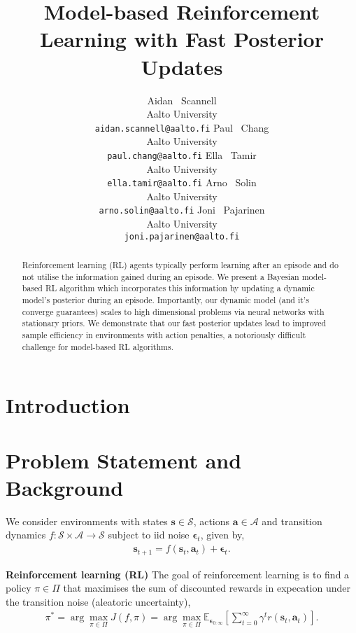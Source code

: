\documentclass{article}
\title{Model-based Reinforcement Learning with Fast Posterior Updates}
\author{%
  Aidan ~Scannell \\
  Aalto University\\
  \texttt{aidan.scannell@aalto.fi}
  \And
  Paul ~Chang \\
  Aalto University\\
  \texttt{paul.chang@aalto.fi}
  \And
  Ella ~Tamir \\
  Aalto University\\
  \texttt{ella.tamir@aalto.fi}
  \And
  Arno ~Solin \\
  Aalto University\\
  \texttt{arno.solin@aalto.fi}
  \And
  Joni ~Pajarinen \\
  Aalto University\\
  \texttt{joni.pajarinen@aalto.fi}
}
\newcommand{\state}{\ensuremath{\mathbf{s}}}
\newcommand{\action}{\ensuremath{\mathbf{a}}}
\newcommand{\noise}{\ensuremath{\bm\epsilon}}
\newcommand{\discount}{\ensuremath{\gamma}}
\newcommand{\stateDomain}{\ensuremath{\mathcal{S}}}
\newcommand{\actionDomain}{\ensuremath{\mathcal{A}}}
\newcommand{\policyDomain}{\ensuremath{\Pi}}
\newcommand{\rewardFn}{\ensuremath{r}}
\newcommand{\transitionFn}{\ensuremath{f}}
\newcommand{\policy}{\ensuremath{\pi}}
\begin{document}
\maketitle

\begin{abstract}
  Reinforcement learning (RL) agents typically perform learning after an episode and do not utilise the information gained during an episode.
  We present a Bayesian model-based RL algorithm which incorporates this information by updating a dynamic model's posterior during an episode.
  Importantly, our dynamic model (and it's converge guarantees) scales to high dimensional problems via neural networks with stationary priors.
  We demonstrate that our fast posterior updates lead to improved sample efficiency in environments with action penalties, a notoriously difficult
  challenge for model-based RL algorithms.

\end{abstract}

\section{Introduction} \label{sec:intro}

\section{Problem Statement and Background} \label{sec:problem-statement}
We consider environments with states \(\state \in \stateDomain \), actions \(\action \in \actionDomain\) and transition dynamics \(\transitionFn: \stateDomain \times \actionDomain \rightarrow \stateDomain \) subject to
iid noise \(\noise_{t}\), given by,
\begin{align}
\state_{t+1} = \transitionFn(\state_{t}, \action_{t}) + \noise_{t}.
\end{align}

\textbf{Reinforcement learning (RL)}
The goal of reinforcement learning is to find a policy \(\pi \in \Pi\) that maximises the sum of discounted
rewards in expecation under the transition noise (aleatoric uncertainty),
\begin{align} \label{eq-model-free-objective}
\policy^{*} = \arg \max_{\policy \in \policyDomain} J(\transitionFn, \policy) = \arg \max_{\policy \in \policyDomain} \mathbb{E}_{\noise_{0:\infty}} \left[ \sum_{t=0}^{\infty} \discount^{t} \rewardFn(\state_{t},\action_{t}) \right].
\end{align}
\end{document}
